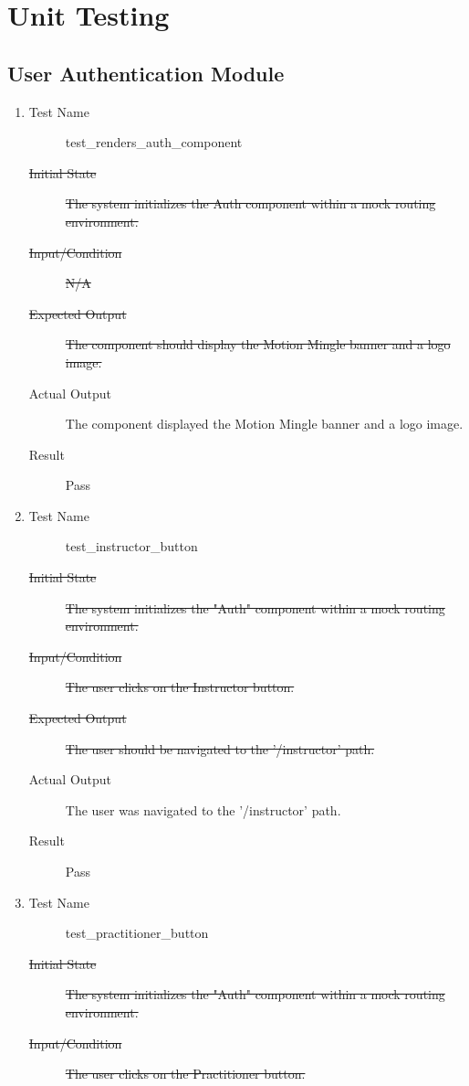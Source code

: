 \documentclass[12pt, titlepage]{article}
\begin{document}
\section{Unit Testing}
\subsection{User Authentication Module}
\begin{enumerate}[UT-UA1]
\item \label{UT-UA1}
  \begin{description}
  \item[Test Name] test\_renders\_auth\_component
  \item[\sout{Initial State}]\sout{ The system initializes the Auth component within a mock
    routing environment.
  }
		\item[\sout{Input/Condition}]\sout{ N/A
  }
		\item[\sout{Expected Output}]\sout{ The component should display the Motion Mingle banner
    and a logo image.
  }
		\item[Actual Output] The component displayed the Motion Mingle banner and a
    logo image.
  \item[Result] Pass
  \end{description}
\item \label{UT-UA2}
  \begin{description}
  \item[Test Name] test\_instructor\_button
  \item[\sout{Initial State}]\sout{ The system initializes the "Auth" component within a mock
    routing environment.
  }
		\item[\sout{Input/Condition}]\sout{ The user clicks on the Instructor button.
  }
		\item[\sout{Expected Output}]\sout{ The user should be navigated to the '/instructor' path.
  }
		\item[Actual Output] The user was navigated to the '/instructor' path.
  \item[Result] Pass
  \end{description}
\item \label{UT-UA3}
  \begin{description}
  \item[Test Name] test\_practitioner\_button
  \item[\sout{Initial State}]\sout{ The system initializes the "Auth" component within a mock
    routing environment.
  }
		\item[\sout{Input/Condition}]\sout{ The user clicks on the Practitioner button.
}
\end{description}
\end{enumerate}
\end{document}
